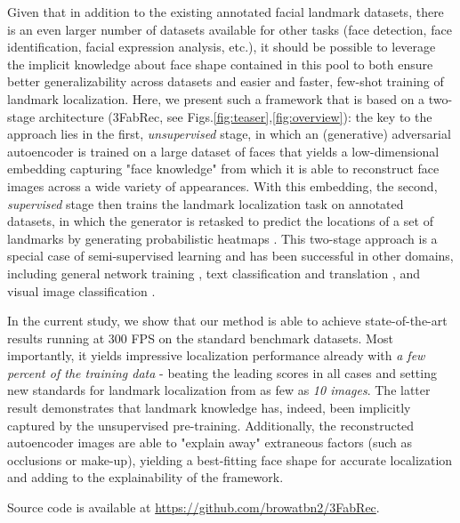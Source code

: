 \documentclass[10pt,twocolumn,letterpaper]{article}
\begin{document}
Given that in addition to the existing annotated facial landmark datasets, there is an even larger number of datasets available for other tasks (face detection, face identification, facial expression analysis, etc.), it should be possible to leverage the implicit knowledge about face shape contained in this pool to both ensure better generalizability across datasets and easier and faster, few-shot training of landmark localization. Here, we present such a framework that is based on a two-stage architecture (3FabRec, see Figs.\ref{fig:teaser},\ref{fig:overview}): the key to the approach lies in the first, {\em unsupervised} stage, in which an (generative) adversarial autoencoder \cite{makhzani2015adversarial} is trained on a large dataset of faces that yields a low-dimensional embedding capturing "face knowledge" \cite{valentine2016face} from which it is able to reconstruct face images across a wide variety of appearances. With this embedding, the second, {\em supervised} stage then trains the landmark localization task on annotated datasets, in which the generator is retasked to predict the locations of a set of landmarks by generating probabilistic heatmaps \cite{Bulat2016}. This two-stage approach is a special case of semi-supervised learning \cite{kingma2014semi,zhu2017semi} and has been successful in other domains, including general network training \cite{hinton2006fast}, text classification \cite{howard2018universal} and translation \cite{devlin2018bert}, and visual image classification \cite{zhang2017split}.

In the current study, we show that our method is able to achieve state-of-the-art results running at 300 FPS on the standard benchmark datasets. Most importantly, it yields impressive localization performance already with {\em a few percent of the training data} - beating the leading scores in all cases and setting new standards for landmark localization from as few as {\em 10 images}. The latter result demonstrates that landmark knowledge has, indeed, been implicitly captured by the unsupervised pre-training. Additionally, the reconstructed autoencoder images are able to "explain away" extraneous factors (such as occlusions or make-up), yielding a best-fitting face shape for accurate localization and adding to the explainability of the framework. 

Source code is available at \url{https://github.com/browatbn2/3FabRec}.
\end{document}
